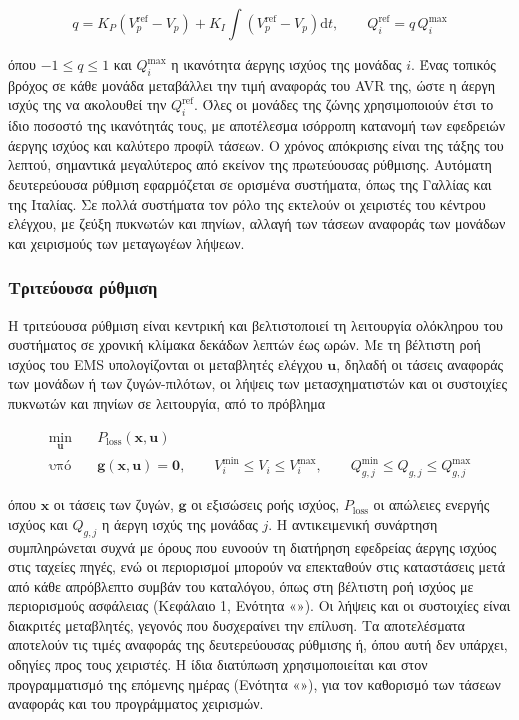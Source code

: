 \begin{equation}
q = K_P \left(V_p^{\mathrm{ref}} - V_p\right)
  + K_I \int \left(V_p^{\mathrm{ref}} - V_p\right) \mathrm{d}t, \qquad
Q_i^{\mathrm{ref}} = q\,Q_i^{\max}
\label{eq:svr}
\end{equation}

όπου $-1 \le q \le 1$ και $Q_i^{\max}$ η ικανότητα άεργης ισχύος της μονάδας $i$. Ένας τοπικός
βρόχος σε κάθε μονάδα μεταβάλλει την τιμή αναφοράς του AVR της, ώστε η άεργη ισχύς της να
ακολουθεί την $Q_i^{\mathrm{ref}}$. Όλες οι μονάδες της ζώνης χρησιμοποιούν έτσι το ίδιο ποσοστό
της ικανότητάς τους, με αποτέλεσμα ισόρροπη κατανομή των εφεδρειών άεργης ισχύος και καλύτερο
προφίλ τάσεων. Ο χρόνος απόκρισης είναι της τάξης του λεπτού, σημαντικά μεγαλύτερος από εκείνον
της πρωτεύουσας ρύθμισης. Αυτόματη δευτερεύουσα ρύθμιση εφαρμόζεται σε ορισμένα συστήματα,
όπως της Γαλλίας και της Ιταλίας. Σε πολλά συστήματα τον ρόλο της εκτελούν οι χειριστές του
κέντρου ελέγχου, με ζεύξη πυκνωτών και πηνίων, αλλαγή των τάσεων αναφοράς των μονάδων και
χειρισμούς των μεταγωγέων λήψεων.

\subsubsection{Τριτεύουσα ρύθμιση}

Η τριτεύουσα ρύθμιση είναι κεντρική και βελτιστοποιεί τη λειτουργία ολόκληρου του συστήματος σε
χρονική κλίμακα δεκάδων λεπτών έως ωρών. Με τη βέλτιστη ροή ισχύος του EMS υπολογίζονται οι
μεταβλητές ελέγχου $\mathbf{u}$, δηλαδή οι τάσεις αναφοράς των μονάδων ή των ζυγών-πιλότων, οι
λήψεις των μετασχηματιστών και οι συστοιχίες πυκνωτών και πηνίων σε λειτουργία, από το πρόβλημα

\begin{equation}
\begin{aligned}
\min_{\mathbf{u}} \quad & P_{\mathrm{loss}}(\mathbf{x}, \mathbf{u}) \\
\text{υπό} \quad & \mathbf{g}(\mathbf{x}, \mathbf{u}) = \mathbf{0}, \qquad
V_i^{\min} \le V_i \le V_i^{\max}, \qquad
Q_{g,j}^{\min} \le Q_{g,j} \le Q_{g,j}^{\max}
\end{aligned}
\label{eq:orpf}
\end{equation}

όπου $\mathbf{x}$ οι τάσεις των ζυγών, $\mathbf{g}$ οι εξισώσεις ροής ισχύος, $P_{\mathrm{loss}}$
οι απώλειες ενεργής ισχύος και $Q_{g,j}$ η άεργη ισχύς της μονάδας $j$. Η αντικειμενική
συνάρτηση συμπληρώνεται συχνά με όρους που ευνοούν τη διατήρηση εφεδρείας άεργης ισχύος στις
ταχείες πηγές, ενώ οι περιορισμοί μπορούν να επεκταθούν στις καταστάσεις μετά από κάθε
απρόβλεπτο συμβάν του καταλόγου, όπως στη βέλτιστη ροή ισχύος με περιορισμούς ασφάλειας
(Κεφάλαιο 1, Ενότητα «»). Οι λήψεις και οι συστοιχίες είναι διακριτές
μεταβλητές, γεγονός που δυσχεραίνει την επίλυση. Τα αποτελέσματα αποτελούν τις τιμές αναφοράς
της δευτερεύουσας ρύθμισης ή, όπου αυτή δεν υπάρχει, οδηγίες προς τους χειριστές. Η ίδια
διατύπωση χρησιμοποιείται και στον προγραμματισμό της επόμενης ημέρας (Ενότητα
«»), για τον καθορισμό των τάσεων αναφοράς και του προγράμματος
χειρισμών.

